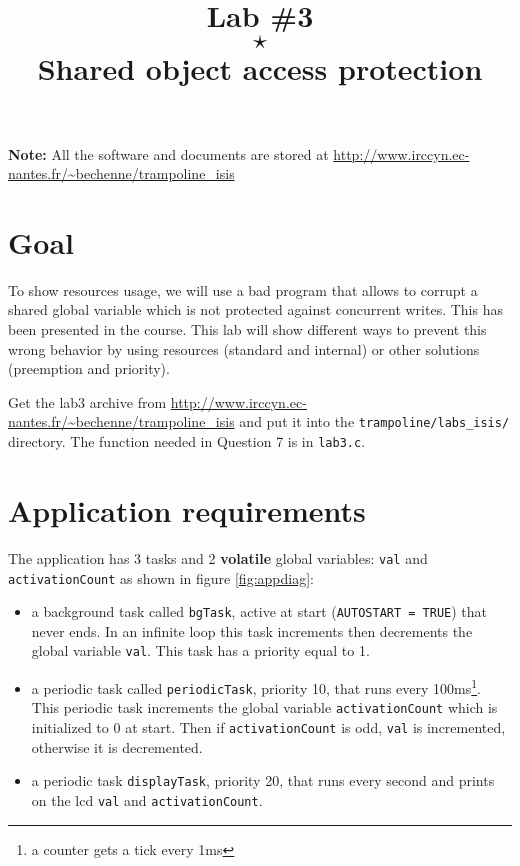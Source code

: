 \documentclass[11pt]{article}
\title{Lab \#3\\$\star$\\Shared object access protection}
\author{}
\begin{document}
\maketitle

{\bf Note:} All the software and documents are stored at \url{http://www.irccyn.ec-nantes.fr/~bechenne/trampoline_isis}

\section{Goal}

To show resources usage, we will use a bad program that allows to corrupt a shared global variable which is not protected against concurrent writes. This has been presented in the course. This lab will show different ways to prevent this wrong behavior by using resources (standard and internal) or other solutions (preemption and priority).

Get the lab3 archive from \url{http://www.irccyn.ec-nantes.fr/~bechenne/trampoline_isis} and put it into the \texttt{trampoline/labs_isis/} directory. The function needed in Question 7 is in \texttt{lab3.c}.


\section{Application requirements}
The application has 3 tasks and 2 \textbf{volatile} global variables: \texttt{val} and \texttt{activationCount} as shown in figure \ref{fig:appdiag}:

\begin{itemize}
\item a background task called \texttt{bgTask}, active at start (\texttt{AUTOSTART = TRUE}) that never ends. In an infinite loop this task increments then decrements the global variable \texttt{val}. This task has a priority equal to 1.

\item a periodic task called \texttt{periodicTask}, priority 10, that runs every 100ms\footnote{a counter gets a tick every 1ms}. This periodic task increments the global variable \texttt{activationCount} which is initialized to 0 at start. Then if \texttt{activationCount} is odd, \texttt{val} is incremented, otherwise it is decremented.

\item a periodic task \texttt{displayTask}, priority 20, that runs every second and prints on the lcd \texttt{val} and \texttt{activationCount}.
\end{itemize}
\end{document}
